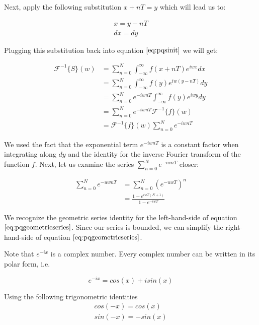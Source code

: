 Next, apply the following substitution $x+nT = y$ which will lead us to:

\begin{gather}
x=y-nT \nonumber \\
dx=dy
\label{eq:substitude1dpq}
\end{gather} 

Plugging this substitution back into equation $\ref{eq:pqsinit}$ we will get: 

\begin{align}
\mathcal{F}^{-1}\{S\}(w)
& =\sum_{n=0}^{N} \int_{-\infty}^{\infty} f(x+nT) e^{iwx}dx \nonumber \\
& =\sum_{n=0}^{N} \int_{-\infty}^{\infty} f(y) e^{iw(y-nT)}dy \nonumber \\
& =\sum_{n=0}^{N} e^{-iwnT} \int_{-\infty}^{\infty} f(y) e^{iwy}dy \nonumber \\
& =\sum_{n=0}^{N} e^{-iwnT} \mathcal{F}^{-1}\{f\}(w) \nonumber \\
& =\mathcal{F}^{-1}\{f\}(w) \sum_{n=0}^{N} e^{-iwnT}
\label{eq:pqsub}  
\end{align}

We used the fact that the exponential term $e^{-iwnT}$ is a constant factor when integrating along $dy$ and the identity for the inverse Fourier transform of the function $f$. Next, let us examine the series $\sum_{n=0}^N e^{-iwnT}$ closer:

\begin{align}
\sum_{n=0}^N e^{-uwnT}
& =\sum_{n=0}^N (e^{-uwT})^n \nonumber \\
& =\frac{1-e^{iwT(N+1)}}{1-e^{-iwT}}
\label{eq:pqgeometricseries}
\end{align}

We recognize the geometric series identity for the left-hand-side of equation $\ref{eq:pqgeometricseries}$. Since our series is bounded, we can simplify the right-hand-side of equation $\ref{eq:pqgeometricseries}$.

Note that $e^{-ix}$ is a complex number. Every complex number can be written in its polar form, i.e. 

\begin{equation}
e^{-ix} = cos(x) + i sin(x) 
\label{eq:polarform}
\end{equation}

Using the following trigonometric identities
\begin{gather}
cos(-x) = cos(x) \nonumber \\
sin(-x) = -sin(x)
\end{gather}

